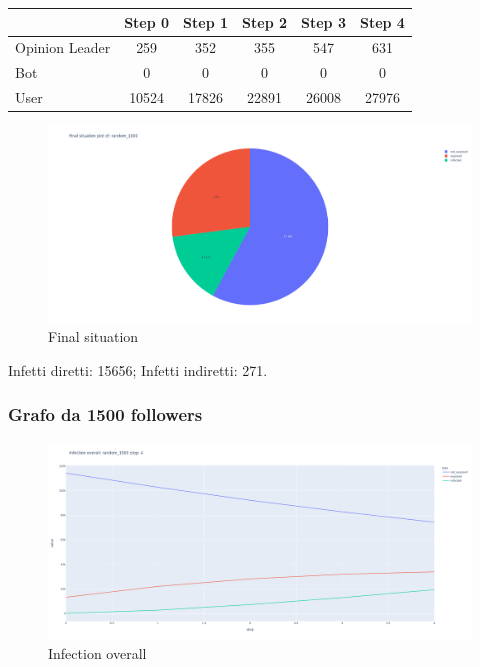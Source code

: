         \begin{table}[H]
            \centering
            \begin{tabular}{|l|c|c|c|c|c|}
            \hline
                           & Step 0 & Step 1 & Step 2 & Step 3 & Step 4 \\ \hline
            Opinion Leader & 259    & 352    & 355    & 547    & 631    \\ \hline
            Bot            & 0      & 0      & 0      & 0      & 0      \\ \hline
            User           & 10524  & 17826  & 22891  & 26008  & 27976  \\ \hline
            \end{tabular}
        \end{table}
        
        \begin{figure}[H]
                \includegraphics[width=16cm]{resources/charts/random_1000_pie.png}
                \caption{Final situation}
                \label{fig:random_1000_pie}
        \end{figure}
        Infetti diretti: 15656; \newline
        Infetti indiretti: 271.
            
    \subsubsection{Grafo da 1500 followers}
        \begin{figure}[H]
            \includegraphics[width=16cm]{resources/charts/random_1500_line.png}
            \caption{Infection overall}
            \label{fig:random_1500_line}
        \end{figure}
        
